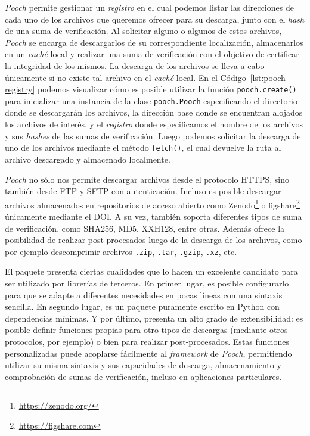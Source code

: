 


\emph{Pooch} permite gestionar un \emph{registro} en el cual podemos listar las
direcciones de cada uno de los archivos que queremos ofrecer para su descarga,
junto con el \emph{hash} de una suma de verificación. Al solicitar alguno
o algunos de estos archivos, \emph{Pooch} se encarga de descargarlos de su
correspondiente localización, almacenarlos en un \emph{caché} local y realizar
una suma de verificación con el objetivo de certificar la integridad de los
mismos.
La descarga de los archivos se lleva a cabo únicamente si no existe tal archivo
en el \emph{caché} local.
En el Código~\ref{lst:pooch-registry} podemos visualizar cómo es posible
utilizar la función \texttt{pooch.create()} para inicializar una instancia de
la clase \texttt{pooch.Pooch} especificando el directorio donde se descargarán
los archivos, la dirección base donde se encuentran alojados los archivos de
interés, y el \emph{registro} donde especificamos el nombre de los archivos
y sus \emph{hashes} de las sumas de verificación.
Luego podemos solicitar la descarga de uno de los archivos mediante el método
\texttt{fetch()}, el cual devuelve la ruta al archivo descargado y almacenado
localmente.

\emph{Pooch} no sólo nos permite descargar archivos desde el protocolo HTTPS,
sino también desde FTP y SFTP con autenticación.
Incluso es posible descargar archivos almacenados en repositorios de acceso
abierto como Zenodo\footnote{\url{https://zenodo.org/}}
o figshare\footnote{\url{https://figshare.com}} únicamente mediante el
\ac{DOI}.
A su vez, también soporta diferentes tipos de suma de verificación, como
SHA256, MD5, XXH128, entre otras.
Además ofrece la posibilidad de realizar post-procesados luego de la descarga
de los archivos, como por ejemplo descomprimir archivos \texttt{.zip},
\texttt{.tar}, \texttt{.gzip}, \texttt{.xz}, etc.

El paquete presenta ciertas cualidades que lo hacen un excelente candidato para
ser utilizado por librerías de terceros.
En primer lugar, es posible configurarlo para que se adapte a diferentes
necesidades en pocas líneas con una sintaxis sencilla.
En segundo lugar, es un paquete puramente escrito en Python con dependencias
mínimas.
Y por último, presenta un alto grado de extensibilidad: es posible definir
funciones propias para otro tipos de descargas (mediante otros protocolos, por
ejemplo) o bien para realizar post-procesados. Estas funciones personalizadas
puede acoplarse fácilmente al \emph{framework} de \emph{Pooch}, permitiendo
utilizar su misma sintaxis y sus capacidades de descarga, almacenamiento
y comprobación de sumas de verificación, incluso en aplicaciones particulares.

